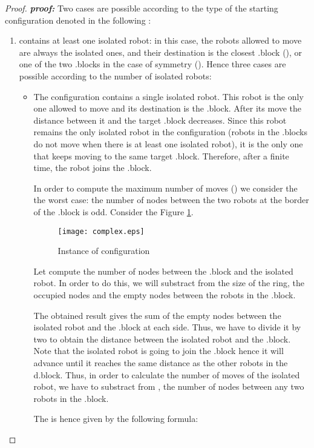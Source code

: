 \documentclass[12pt]{llncs}
\begin{document}
\begin{proof}
\textit{\textbf{proof:}} Two cases are possible according to the type of the starting configuration denoted in the following :
\begin{enumerate}
\item{ contains at least one isolated robot:} 
in this case, the robots allowed to move are always the isolated ones, and their destination is the closest .block (), or one of the two .blocks in the case of symmetry (). Hence three cases are possible according to the number of isolated robots:
\begin{itemize}
\item{The configuration  contains a single isolated robot. This robot is the only one allowed to move and its destination is the .block. After its move the distance between it and the target .block decreases. Since this robot remains the only isolated robot in the configuration (robots in the .blocks do not move when there is at least one isolated robot), it is the only one that keeps moving to the same target .block. Therefore, after a finite time, the robot joins the .block. 

In order to compute the maximum number of moves () we consider the 
the worst case: the number of nodes between the two robots at the border of the .block is odd.  
Consider the Figure \ref{fig:case1}.

\begin{figure}[H]
  \centering
  \texttt{[image: complex.eps]}
    \caption{Instance of configuration} 
    \label{fig:case1}
\end{figure}

Let compute the number of nodes between the .block and the isolated robot. In order to do this, we will substract from the size of the ring, the occupied nodes and the empty nodes between the robots in the .block. 


The obtained result gives the sum of the empty nodes between the isolated robot and the .block at each side. Thus, we have to divide it by two to obtain the distance between the isolated robot and the .block. Note that the isolated robot is going to join the .block hence it will advance until it reaches the same distance as the other robots in the d.block. Thus, in order to calculate the number of moves of the isolated robot, we have to substract from , the number of nodes between any two robots in the .block. 






The  is hence given by the following formula: 
}



\end{itemize}
\end{enumerate}
\end{proof}
\end{document}
